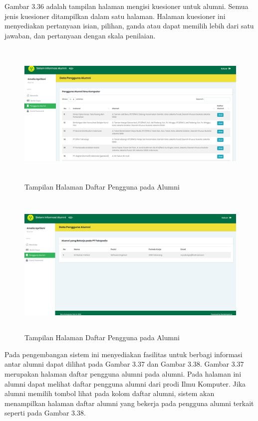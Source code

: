 Gambar 3.36 adalah tampilan halaman mengisi kuesioner untuk alumni. Semua jenis kuesioner ditampilkan dalam satu halaman. Halaman kuesioner ini menyediakan pertanyaan isian, pilihan, ganda atau dapat memilih lebih dari satu jawaban, dan pertanyaan dengan skala penilaian.


\begin{figure}[H]
	\centering
	\includegraphics[width=14cm,height=7cm]{gambar/tampilan/alumni_daftarPengguna}
	\caption{Tampilan Halaman Daftar Pengguna pada Alumni }
	\label{ui_alumniDaftarPengguna}
\end{figure}

\begin{figure}[H]
	\centering
	\includegraphics[width=14cm,height=7cm]{gambar/tampilan/alumni_alumniPengguna}
	\caption{Tampilan Halaman Daftar Pengguna pada Alumni }
	\label{ui_alumniPengguna}
\end{figure}

Pada pengembangan sistem ini menyediakan fasilitas untuk berbagi informasi antar alumni dapat dilihat pada Gambar 3.37 dan Gambar 3.38. Gambar 3.37 merupakan halaman daftar pengguna alumni pada alumni. Pada halaman ini alumni dapat melihat daftar pengguna alumni dari prodi Ilmu Komputer. Jika alumni memilih tombol lihat pada kolom daftar alumni, sistem akan menampilkan halaman daftar alumni yang bekerja pada pengguna alumni terkait seperti pada Gambar 3.38. 

